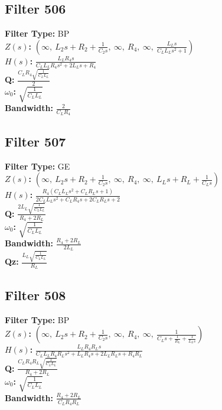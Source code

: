 \documentclass{article}
\begin{document}
\subsection*{Filter 506}
\textbf{Filter Type:} BP \\ 
\textbf{$Z(s)$:} $\left( \infty, \  L_{2} s + R_{2} + \frac{1}{C_{2} s}, \  \infty, \  R_{4}, \  \infty, \  \frac{L_{L} s}{C_{L} L_{L} s^{2} + 1}\right)$ \\ 
\textbf{$H(s)$:} $\frac{L_{L} R_{4} s}{C_{L} L_{L} R_{4} s^{2} + 2 L_{L} s + R_{4}}$ \\ 
\textbf{Q:} $\frac{C_{L} R_{4} \sqrt{\frac{1}{C_{L} L_{L}}}}{2}$ \\ 
\textbf{$\omega_0$:} $\sqrt{\frac{1}{C_{L} L_{L}}}$ \\ 
\textbf{Bandwidth:} $\frac{2}{C_{L} R_{4}}$ \\ 
\subsection*{Filter 507}
\textbf{Filter Type:} GE \\ 
\textbf{$Z(s)$:} $\left( \infty, \  L_{2} s + R_{2} + \frac{1}{C_{2} s}, \  \infty, \  R_{4}, \  \infty, \  L_{L} s + R_{L} + \frac{1}{C_{L} s}\right)$ \\ 
\textbf{$H(s)$:} $\frac{R_{4} \left(C_{L} L_{L} s^{2} + C_{L} R_{L} s + 1\right)}{2 C_{L} L_{L} s^{2} + C_{L} R_{4} s + 2 C_{L} R_{L} s + 2}$ \\ 
\textbf{Q:} $\frac{2 L_{L} \sqrt{\frac{1}{C_{L} L_{L}}}}{R_{4} + 2 R_{L}}$ \\ 
\textbf{$\omega_0$:} $\sqrt{\frac{1}{C_{L} L_{L}}}$ \\ 
\textbf{Bandwidth:} $\frac{R_{4} + 2 R_{L}}{2 L_{L}}$ \\ 
\textbf{Qz:} $\frac{L_{L} \sqrt{\frac{1}{C_{L} L_{L}}}}{R_{L}}$ \\ 
\subsection*{Filter 508}
\textbf{Filter Type:} BP \\ 
\textbf{$Z(s)$:} $\left( \infty, \  L_{2} s + R_{2} + \frac{1}{C_{2} s}, \  \infty, \  R_{4}, \  \infty, \  \frac{1}{C_{L} s + \frac{1}{R_{L}} + \frac{1}{L_{L} s}}\right)$ \\ 
\textbf{$H(s)$:} $\frac{L_{L} R_{4} R_{L} s}{C_{L} L_{L} R_{4} R_{L} s^{2} + L_{L} R_{4} s + 2 L_{L} R_{L} s + R_{4} R_{L}}$ \\ 
\textbf{Q:} $\frac{C_{L} R_{4} R_{L} \sqrt{\frac{1}{C_{L} L_{L}}}}{R_{4} + 2 R_{L}}$ \\ 
\textbf{$\omega_0$:} $\sqrt{\frac{1}{C_{L} L_{L}}}$ \\ 
\textbf{Bandwidth:} $\frac{R_{4} + 2 R_{L}}{C_{L} R_{4} R_{L}}$ \\ 
\end{document}
